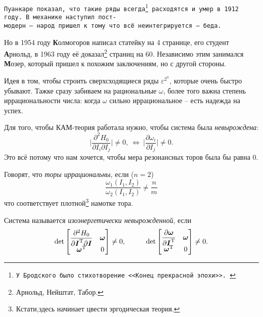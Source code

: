 \texttt{Пуанкаре показал, что такие ряды всегда\footnote{
    \texttt{У Бродского было стихотворение <<Конец прекрасной эпохи>>. } 
}  расходятся и умер в 1912 году. В механике наступил пост- \\модерн -- народ пришел к тому что всё неинтегрируется -- беда.} 


Но в 1954 году \textbf{К}олмогоров написал статейку на 4 странице, его студент \textbf{А}рнольд, в 1963 году её доказал\footnote{
    Арнольд, Нейштат, Табор.
}  страниц на 60. Независимо этим занимался \textbf{М}озер, который пришел к похожим заключениям, но с другой стороны. 

Идея в том, чтобы строить сверхсходящиеся ряды $\varepsilon^{2^n}$, которые очень быстро убывают. Тажке сразу забиваем на рациональные $\omega$, более того важна степень иррациональности числа: когда $\omega$ сильно иррациональное -- есть надежда на успех.

\begin{to_def}
    Для того, чтобы КАМ-теория работала нужно, чтобы система была \textit{невырождена}:
    \begin{equation*}
        \bigg|
            \frac{\partial^2 H_0}{\partial I_i \partial I_j} 
        \bigg| \neq 0, \ \Leftrightarrow \ \bigg|
            \frac{\partial \omega_i}{\partial I_j} 
        \bigg| \neq 0.
    \end{equation*}
    Это всё потому что нам хочется, чтобы мера резонансных торов была бы равна 0. 
\end{to_def}

\begin{to_def}
    Говорят, что \textit{торы иррациональны}, если ($n=2$)
    \begin{equation*}
        \frac{\omega_1 (I_1, I_2)}{\omega_2 (I_1, I_2)} \neq \frac{n}{m}
    \end{equation*}
    что соответствует плотной\footnote{
        Кстати,здесь начинает цвести эргодическая теория.
    }  намотке тора. 
\end{to_def}


\begin{to_def}
    Система называется \textit{изоэнергетически невырожденной}, если
    \begin{equation*}
        \det \begin{bmatrix}
            \dfrac{\partial^2 H_0}{\partial \vc{I}\T \partial \vc{I}} & \vc{\omega} \\
            \vc{\omega}\T & 0
        \end{bmatrix} \neq 0,
\hspace{10 mm}
        \det \begin{bmatrix}
            \dfrac{\partial \vc{\omega} }{\partial \vc{I}\T } & \vc{\omega} \\
            \vc{\omega}\T & 0
        \end{bmatrix} \neq 0.
    \end{equation*}
\end{to_def}



